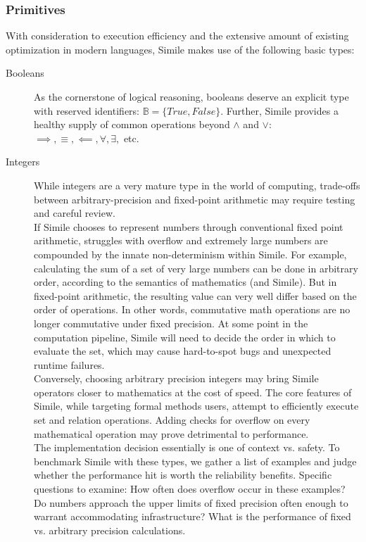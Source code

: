 \documentclass{article}
\begin{document}
\subsubsection{Primitives}
With consideration to execution efficiency and the extensive amount of existing optimization in modern languages, Simile makes use of the following basic types:
\begin{description}
    \item[Booleans] As the cornerstone of logical reasoning, booleans deserve an explicit type with reserved identifiers: $\mathbb{B} = \{True, False\}$. Further, Simile provides a healthy supply of common operations beyond $\land$ and $\lor$: $\implies, \equiv, \impliedby, \forall, \exists,$ etc.
    \item[Integers] While integers are a very mature type in the world of computing, trade-offs between arbitrary-precision and fixed-point arithmetic may require testing and careful review.
    \\
    If Simile chooses to represent numbers through conventional fixed point arithmetic, struggles with overflow and extremely large numbers are compounded by the innate non-determinism within Simile. For example, calculating the sum of a set of very large numbers can be done in arbitrary order, according to the semantics of mathematics (and Simile). But in fixed-point arithmetic, the resulting value can very well differ based on the order of operations. In other words, commutative math operations are no longer commutative under fixed precision. At some point in the computation pipeline, Simile will need to decide the order in which to evaluate the set, which may cause hard-to-spot bugs and unexpected runtime failures.
    \\
    Conversely, choosing arbitrary precision integers may bring Simile operators closer to mathematics at the cost of speed. The core features of Simile, while targeting formal methods users, attempt to efficiently execute set and relation operations. Adding checks for overflow on every mathematical operation may prove detrimental to performance.
    \\
    The implementation decision essentially is one of context vs. safety. To benchmark Simile with these types, we gather a list of examples and judge whether the performance hit is worth the reliability benefits. Specific questions to examine: How often does overflow occur in these examples? Do numbers approach the upper limits of fixed precision often enough to warrant accommodating infrastructure? What is the performance of fixed vs. arbitrary precision calculations.

\end{description}
\end{document}
